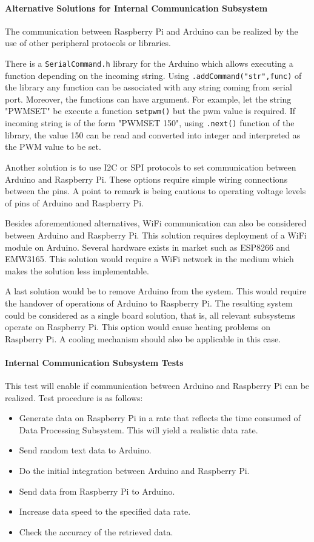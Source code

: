 \documentclass[a4paper,12pt]{article}
\begin{document}
	\paragraph{Alternative Solutions for Internal Communication Subsystem}
		The communication between Raspberry Pi and Arduino can be realized by the use of other peripheral protocols or libraries.
	
		There is a \texttt{SerialCommand.h} library for the Arduino which allows executing a function depending on the incoming string. Using \lstinline|.addCommand("str",func)| of the library any function can be associated with any string coming from serial port. Moreover, the functions can have argument. For example, let the string "PWMSET" be execute a function \lstinline|setpwm()| but the pwm value is required. If incoming string is of the form "PWMSET 150", using \lstinline|.next()| function of the library, the value 150 can be read and converted into integer and interpreted as the PWM value to be set.
		
		Another solution is to use I2C or SPI protocols to set communication between Arduino and Raspberry Pi. These options require simple wiring connections between the pins. A point to remark is being cautious to operating voltage levels of pins of Arduino and Raspberry Pi.
		
		Besides aforementioned alternatives, WiFi communication can also be considered between Arduino and Raspberry Pi. This solution requires deployment of a WiFi module on Arduino. Several hardware exists in market such as ESP8266 and EMW3165. This solution would require a WiFi network in the medium which makes the solution less implementable.
		
		A last solution would be to remove Arduino from the system. This would require the handover of operations of Arduino to Raspberry Pi. The resulting system could be considered as a single board solution, that is, all relevant subsystems operate on Raspberry Pi. This option would cause heating problems on Raspberry Pi. A cooling mechanism should also be applicable in this case.
	\paragraph{Internal Communication Subsystem Tests}
	This test will enable if communication between Arduino and Raspberry Pi can be realized. Test procedure is as follows:
	\begin{itemize}
		\item Generate data on Raspberry Pi in a rate that reflects the time consumed of Data Processing Subsystem. This will yield a realistic data rate.
		\item Send random text data to Arduino.
		\item Do the initial integration between Arduino and Raspberry Pi.
		\item Send data from Raspberry Pi to Arduino.
		\item Increase data speed to the specified data rate.
		\item Check the accuracy of the retrieved data.
	\end{itemize}
	
\end{document}
